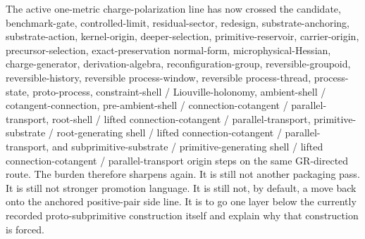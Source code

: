 \documentclass[11pt]{article}
\begin{document}
The active one-metric charge-polarization line has now crossed the candidate, benchmark-gate, controlled-limit, residual-sector, redesign, substrate-anchoring, substrate-action, kernel-origin, deeper-selection, primitive-reservoir, carrier-origin, precursor-selection, exact-preservation normal-form, microphysical-Hessian, charge-generator, derivation-algebra, reconfiguration-group, reversible-groupoid, reversible-history, reversible process-window, reversible process-thread, process-state, proto-process, constraint-shell / Liouville-holonomy, ambient-shell / cotangent-connection, pre-ambient-shell / connection-cotangent / parallel-transport, root-shell / lifted connection-cotangent / parallel-transport, primitive-substrate / root-generating shell / lifted connection-cotangent / parallel-transport, and subprimitive-substrate / primitive-generating shell / lifted connection-cotangent / parallel-transport origin steps on the same GR-directed route. The burden therefore sharpens again. It is still not another packaging pass. It is still not stronger promotion language. It is still not, by default, a move back onto the anchored positive-pair side line. It is to go one layer below the currently recorded proto-subprimitive construction itself and explain why that construction is forced.
\end{document}
